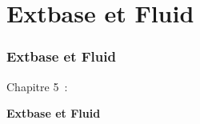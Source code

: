 %

\section{Extbase et Fluid}
\begin{frame}[fragile]
	\frametitle{Extbase et Fluid}

	\begin{center}\huge{Chapitre 5~:}\end{center}
	\begin{center}\huge{\color{typo3darkgrey}\textbf{Extbase et Fluid}}\end{center}

\end{frame}

